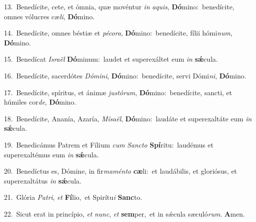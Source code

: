 {\numbfont\textcolor{\numbcolor}{13.}}~Benedícite, cete, et ómnia, quæ movéntur \textit{in} \textit{a}\-\textit{quis}, \textbf{Dó}\-mino:~\star benedícite, omnes vólucres cæ\-\textit{li}\-, \textbf{Dó}\-mino.\par
{\numbfont\textcolor{\numbcolor}{14.}}~Benedícite, omnes béstiæ et \textit{pé}\-\textit{co}\textit{ra}, \textbf{Dó}\-mino:~\star benedícite, fílii hómi\-\textit{num}\-, \textbf{Dó}\-mino.\par
{\numbfont\textcolor{\numbcolor}{15.}}~Benedícat \textit{Is}\-\textit{ra}\textit{ël} \textbf{Dó}\-minum:~\star laudet et superexáltet eum \textit{in} \textbf{sǽ}\-cula.\par
{\numbfont\textcolor{\numbcolor}{16.}}~Benedícite, sacerdótes \textit{Dó}\-\textit{mi}\textit{ni}, \textbf{Dó}\-mino:~\star benedícite, servi Dómi\-\textit{ni}\-, \textbf{Dó}\-mino.\par
{\numbfont\textcolor{\numbcolor}{17.}}~Benedícite, spíritus, et ánimæ \textit{jus}\-\textit{tó}\textit{rum}, \textbf{Dó}\-mino:~\star benedícite, sancti, et húmiles cor\-\textit{de}\-, \textbf{Dó}\-mino.\par
{\numbfont\textcolor{\numbcolor}{18.}}~Benedícite, Ananía, Azaría, \textit{Mí}\-\textit{sa}\textit{ël}, \textbf{Dó}\-mino:~\star laudáte et superexaltáte eum \textit{in} \textbf{sǽ}\-cula.\par
{\numbfont\textcolor{\numbcolor}{19.}}~Benedicámus Patrem et Fílium \textit{cum} \textit{Sanc}\-\textit{to} \textbf{Spí}\-ritu:~\star laudémus et superexaltémus eum \textit{in} \textbf{sǽ}\-cula.\par
{\numbfont\textcolor{\numbcolor}{20.}}~Benedíctus es, Dómine, in fir\-\textit{ma}\-\textit{mén}\textit{to} \textbf{cæ}\-li:~\star et laudábilis, et gloriósus, et superexaltátus \textit{in} \textbf{sǽ}\-cula.\par
{\numbfont\textcolor{\numbcolor}{21.}}~Glória \textit{Pa}\-\textit{tri}, \textit{et} \textbf{Fí}\-lio,~\star et Spirítu\textit{i} \textbf{Sanc}\-to.\par
{\numbfont\textcolor{\numbcolor}{22.}}~Sicut erat in princípio, \textit{et} \textit{nunc}\-, \textit{et} \textbf{sem}\-per,~\star et in sǽcula sæculó\-\textit{rum}\-. \textbf{A}\-men.\par
